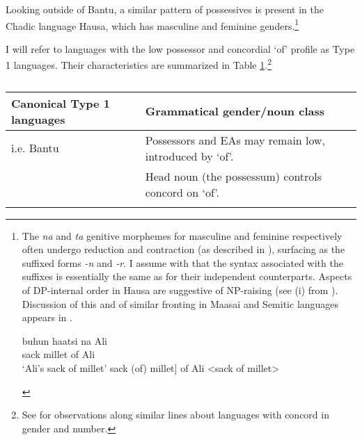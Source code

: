 \documentclass[output=paper
,modfonts
,nonflat]{langsci/langscibook}
\begin{document}
Looking outside of Bantu, a similar pattern of possessives is present in the Chadic language Hausa, which has masculine and feminine genders.\footnote{The \textit{na} and \textit{ta} genitive morphemes for masculine and feminine respectively often undergo reduction and contraction (as described in \citealt{Tuller1986}), surfacing as the suffixed forms \textit{-n} and \textit{-r}. I assume with \citet{Tuller1986} that the syntax associated with the suffixes is essentially the same as for their independent counterparts. Aspects of DP-internal order in Hausa are suggestive of NP-raising (see (i) from \citealt[30]{Tuller1986}). Discussion of this and of similar fronting in Maasai and Semitic languages appears in .
\begin{exe}
	\ex 
	\xlist
	\ex 
	\gll buhun haatsi na Ali\\
	sack     millet  of Ali\\
	\glt `Ali's sack of millet'  	
	\ex {[}sack (of) millet{]} of Ali <sack of millet>
	
	\endxlist
\end{exe}}

I will refer to languages with the low possessor and concordial `of' profile as Type 1 languages. Their characteristics are summarized in Table \ref{tab-carstens:1}.\footnote{See \citet{Giusti2008} for observations along similar lines about languages with concord in gender and number.} 

\begin{table}
	\caption{}
	\label{tab-carstens:1}
	\begin{tabularx}{\textwidth}{lX}
		\lsptoprule
		Canonical Type 1 languages & Grammatical gender/noun class\\\midrule
		i.e. Bantu          & Possessors and EAs may remain low, introduced by ‘of’.\\
                            & Head noun (the possessum) controls concord on ‘of’.\\
		\lspbottomrule
	\end{tabularx}
\end{table}  
\end{document}
